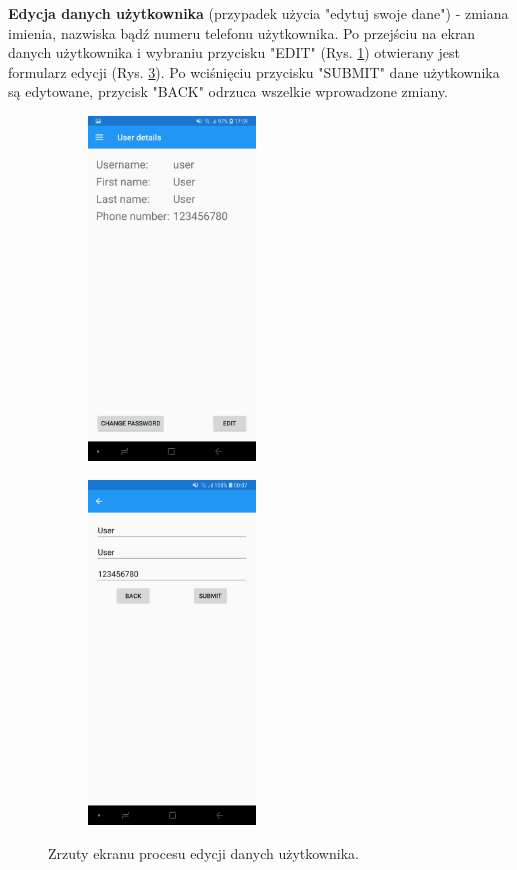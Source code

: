 \textbf{Edycja danych użytkownika} (przypadek użycia "edytuj swoje dane") - zmiana imienia, nazwiska bądź numeru telefonu użytkownika. Po przejściu na ekran danych użytkownika i wybraniu przycisku "EDIT" (Rys. \ref{uzytkownik_edit}) otwierany jest formularz edycji (Rys. \ref{edycja_uzytkownika}). Po wciśnięciu przycisku "SUBMIT" dane użytkownika są edytowane, przycisk "BACK" odrzuca wszelkie wprowadzone zmiany.
\begin{figure}[!ht]
	\begin{center}
		\begin{subfigure}[b]{0.3\textwidth}
			\includegraphics[width=1.75in]{img/mobile/uzytkownik.jpg}
			\label{uzytkownik_edit}
		\end{subfigure}
		\begin{subfigure}[b]{0.3\textwidth}
			\includegraphics[width=1.75in]{img/mobile/edycja_uzytkownika.jpg}
			\label{edycja_uzytkownika}
		\end{subfigure}
	\end{center}
	\caption{Zrzuty ekranu procesu edycji danych użytkownika.}
\end{figure}

